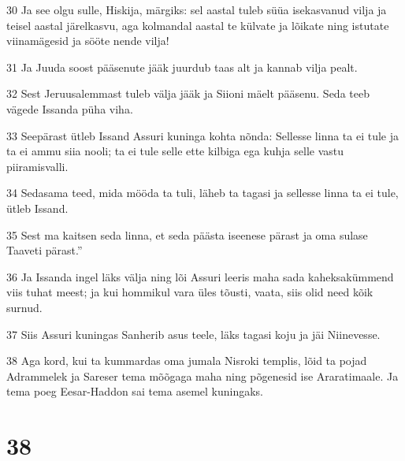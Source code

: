 \par 30 Ja see olgu sulle, Hiskija, märgiks: sel aastal tuleb süüa isekasvanud vilja ja teisel aastal järelkasvu, aga kolmandal aastal te külvate ja lõikate ning istutate viinamägesid ja sööte nende vilja!
\par 31 Ja Juuda soost pääsenute jääk juurdub taas alt ja kannab vilja pealt.
\par 32 Sest Jeruusalemmast tuleb välja jääk ja Siioni mäelt pääsenu. Seda teeb vägede Issanda püha viha.
\par 33 Seepärast ütleb Issand Assuri kuninga kohta nõnda: Sellesse linna ta ei tule ja ta ei ammu siia nooli; ta ei tule selle ette kilbiga ega kuhja selle vastu piiramisvalli.
\par 34 Sedasama teed, mida mööda ta tuli, läheb ta tagasi ja sellesse linna ta ei tule, ütleb Issand.
\par 35 Sest ma kaitsen seda linna, et seda päästa iseenese pärast ja oma sulase Taaveti pärast.”
\par 36 Ja Issanda ingel läks välja ning lõi Assuri leeris maha sada kaheksakümmend viis tuhat meest; ja kui hommikul vara üles tõusti, vaata, siis olid need kõik surnud.
\par 37 Siis Assuri kuningas Sanherib asus teele, läks tagasi koju ja jäi Niinevesse.
\par 38 Aga kord, kui ta kummardas oma jumala Nisroki templis, lõid ta pojad Adrammelek ja Sareser tema mõõgaga maha ning põgenesid ise Araratimaale. Ja tema poeg Eesar-Haddon sai tema asemel kuningaks.

\chapter{38}

